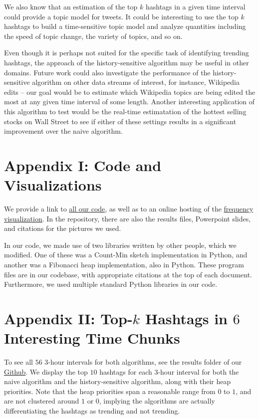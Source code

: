 \documentclass[twoside]{article}
\begin{document}
{We also know that an estimation of the top $k$ hashtags in a given time interval could provide a topic model for tweets. It could be interesting to use the top $k$ hashtags to build a time-sensitive topic model and analyze quantities including the speed of topic change, the variety of topics, and so on.

Even though it is perhaps not suited for the specific task of identifying trending hashtags, 
the approach of the history-sensitive algorithm may be useful in other domains.
Future work could also investigate the performance of the history-sensitive algorithm on other data streams of interest, for instance, Wikipedia edits -- our goal would be to estimate which Wikipedia topics are being edited the most at any given time interval of some length. Another interesting application of this algorithm to test would be the real-time estimatation of the hottest selling stocks on Wall Street to see if either of these settings results in a significant improvement over the naive algorithm.

\section{Appendix I: Code and Visualizations} \label{sec:Appendix_code_viz}

We provide a link to \href{https://github.com/kiranvodrahalli/cos521/}{all our code}, as well as to an online hosting of the \href{http://www.princeton.edu/~awlee/trends.html}{frequency visualization}. In the repository, there are also the results files, Powerpoint slides, and citations for the pictures we used.

In our code, we made use of two libraries written by other people, which we modified. One of these was a Count-Min sketch implementation in Python, and another was a Fibonacci heap implementation, also in Python. These program files are in our codebase, with appropriate citations at the top of each document. Furthermore, we used multiple standard Python libraries in our code.

\section{Appendix II: Top-$k$ Hashtags in $6$ Interesting Time Chunks} \label{sec:Appendix_topk}

To see all $56$ $3$-hour intervals for both algorithms, see the results folder of our \href{https://github.com/kiranvodrahalli/cos521/}{Github}. We display the top $10$ hashtags for each $3$-hour interval for both the naive algorithm and the history-sensitive algorithm, along with their heap priorities. Note that the heap priorities span a reasonable range from $0$ to $1$, and are not clustered around $1$ or $0$, implying the algorithms are actually differentiating the hashtags as trending and not trending. 

}
\end{document}
